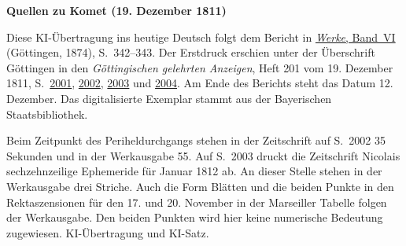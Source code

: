 \clearpage\thispagestyle{empty}
\begin{center}\textbf{Quellen zu Komet (19. Dezember 1811)}\end{center}
\noindent Diese KI-Übertragung ins heutige Deutsch folgt dem Bericht in \href{https://gdz.sub.uni-goettingen.de/id/PPN236007467}{\textit{Werke}, Band~VI} (Göttingen, 1874), S.~342--343. Der Erstdruck erschien unter der Überschrift Göttingen in den \textit{Göttingischen gelehrten Anzeigen}, Heft 201 vom 19. Dezember 1811, S.~\href{https://api.digitale-sammlungen.de/iiif/image/v2/bsb10538680_00977/full/1600,/0/default.jpg}{2001}, \href{https://api.digitale-sammlungen.de/iiif/image/v2/bsb10538680_00978/full/1600,/0/default.jpg}{2002}, \href{https://api.digitale-sammlungen.de/iiif/image/v2/bsb10538680_00979/full/1600,/0/default.jpg}{2003} und \href{https://api.digitale-sammlungen.de/iiif/image/v2/bsb10538680_00980/full/1600,/0/default.jpg}{2004}. Am Ende des Berichts steht das Datum 12. Dezember. Das digitalisierte Exemplar stammt aus der Bayerischen Staatsbibliothek.
\par\smallskip\noindent Beim Zeitpunkt des Periheldurchgangs stehen in der Zeitschrift auf S.~2002 35 Sekunden und in der Werkausgabe 55. Auf S.~2003 druckt die Zeitschrift Nicolais sechzehnzeilige Ephemeride für Januar 1812 ab. An dieser Stelle stehen in der Werkausgabe drei Striche. Auch die Form Blätten und die beiden Punkte in den Rektaszensionen für den 17. und 20. November in der Marseiller Tabelle folgen der Werkausgabe. Den beiden Punkten wird hier keine numerische Bedeutung zugewiesen. KI-Übertragung und KI-Satz.
\clearpage
